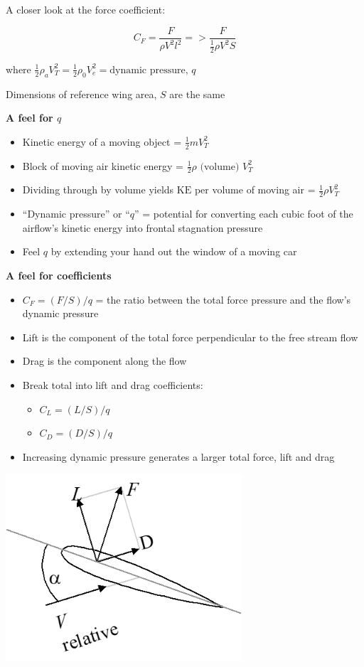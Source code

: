 \documentclass[
]{book}
\providecommand{\tightlist}{%
  \setlength{\itemsep}{0pt}\setlength{\parskip}{0pt}}
\begin{document}
A closer look at the force coefficient:

\[C_F = \frac{F}{\rho V^2 l^2} => \frac{F}{\frac{1}{2} \rho V^2 S} \]

where \(\frac{1}{2} \rho_a V_T^2 = \frac{1}{2} \rho_0 V_e^2 = \text{dynamic pressure}\text{, }q\)

Dimensions of reference wing area, \(S\) are the same

\textbf{A feel for \(q\)}

\begin{itemize}
\tightlist
\item
  Kinetic energy of a moving object = \(\frac{1}{2} m V_T^2\)
\item
  Block of moving air kinetic energy = \(\frac{1}{2} \rho \text{ (volume) } V_T^2\)
\item
  Dividing through by volume yields \(\mathrm{KE}\) per volume of moving air = \(\frac{1}{2} \rho V_T^2\)
\item
  ``Dynamic pressure'' or ``\(q\)'' = potential for converting each cubic foot of the airflow's kinetic energy into frontal stagnation pressure
\item
  Feel \(q\) by extending your hand out the window of a moving car
\end{itemize}

\textbf{A feel for coefficients}

\begin{itemize}
\tightlist
\item
  \(C_F = (F/S)/q\) = the ratio between the total force pressure and the flow's dynamic pressure
\item
  Lift is the component of the total force perpendicular to the free stream flow
\item
  Drag is the component along the flow
\item
  Break total into lift and drag coefficients:

  \begin{itemize}
  \tightlist
  \item
    \(C_L = (L/S)/q\)
  \item
    \(C_D = (D/S)/q\)
  \end{itemize}
\item
  Increasing dynamic pressure generates a larger total force, lift and drag
\end{itemize}

\includegraphics[width=\textwidth,height=2.75in]{media/05/image5.png}
\end{document}
